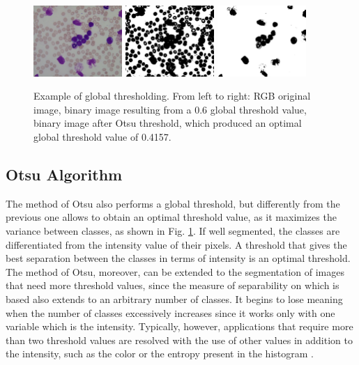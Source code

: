 \documentclass[final,a4paper,12pt,english]{UnicaPhdThesis3}
\begin{document}
\begin{figure}[h]
	\centering
	\includegraphics[width=0.3\textwidth]{images/figcs_rgb}
	\includegraphics[width=0.3\textwidth]{images/fig_global}
	\includegraphics[width=0.3\textwidth]{images/fig_otsu}
	\caption{\label{fig:otsu}Example of global thresholding. From left to right: RGB original image, binary image resulting from a 0.6 global threshold value, binary image after Otsu threshold, which produced an optimal global threshold value of 0.4157.}
\end{figure}

\subsection{Otsu Algorithm} \label{Otsu} %
The method of Otsu \cite{Otsu} also performs a global threshold, but differently from the previous one allows to obtain an optimal threshold value, as it maximizes the variance between classes, as shown in Fig. \ref{fig:otsu}. If well segmented, the classes are differentiated from the intensity value of their pixels. A threshold that gives the best separation between the classes in terms of intensity is an optimal threshold. The method of Otsu, moreover, can be extended to the segmentation of images that need more threshold values, since the measure of separability on which is based also extends to an arbitrary number of classes. It begins to lose meaning when the number of classes excessively increases since it works only with one variable which is the intensity. Typically, however, applications that require more than two threshold values are resolved with the use of other values in addition to the intensity, such as the color or the entropy present in the histogram \cite{Kapur}.
\end{document}
